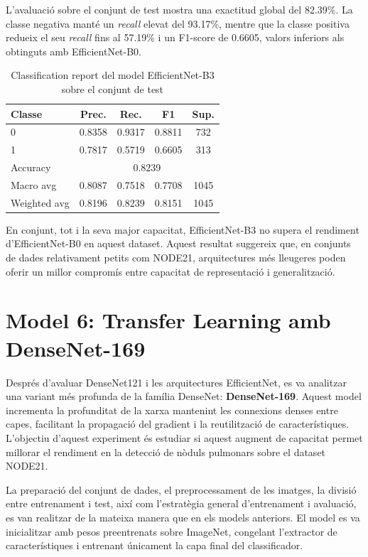 \documentclass[conference]{IEEEtran}
\begin{document}
L’avaluació sobre el conjunt de test mostra una exactitud global del 82.39\%. La classe
negativa manté un \textit{recall} elevat del 93.17\%, mentre que la classe positiva redueix
el seu \textit{recall} fins al 57.19\% i un F1-score de 0.6605, valors inferiors als obtinguts
amb EfficientNet-B0.

\begin{table}[H]
\caption{Classification report del model EfficientNet-B3 sobre el conjunt de test}
\label{tab:classification_report_efficientnet_b3}
\centering
\footnotesize
\setlength{\tabcolsep}{3pt}
\begin{tabular}{lcccc}
\toprule
\textbf{Classe} & \textbf{Prec.} & \textbf{Rec.} & \textbf{F1} & \textbf{Sup.} \\
\midrule
0 & 0.8358 & 0.9317 & 0.8811 & 732 \\
1 & 0.7817 & 0.5719 & 0.6605 & 313 \\
\midrule
Accuracy     & \multicolumn{4}{c}{0.8239} \\
Macro avg    & 0.8087 & 0.7518 & 0.7708 & 1045 \\
Weighted avg & 0.8196 & 0.8239 & 0.8151 & 1045 \\
\bottomrule
\end{tabular}
\end{table}

En conjunt, tot i la seva major capacitat, EfficientNet-B3 no supera el rendiment
d’EfficientNet-B0 en aquest dataset. Aquest resultat suggereix que, en conjunts de
dades relativament petits com NODE21, arquitectures més lleugeres poden oferir un
millor compromís entre capacitat de representació i generalització.

\section{Model 6: Transfer Learning amb DenseNet-169}

Després d’avaluar DenseNet121 i les arquitectures EfficientNet, es va analitzar una
variant més profunda de la família DenseNet: \textbf{DenseNet-169}. Aquest model
incrementa la profunditat de la xarxa mantenint les connexions denses entre capes,
facilitant la propagació del gradient i la reutilització de característiques. L’objectiu
d’aquest experiment és estudiar si aquest augment de capacitat permet millorar el
rendiment en la detecció de nòduls pulmonars sobre el dataset NODE21.

La preparació del conjunt de dades, el preprocessament de les imatges, la divisió
entre entrenament i test, així com l’estratègia general d’entrenament i avaluació, es
van realitzar de la mateixa manera que en els models anteriors. El model es va
inicialitzar amb pesos preentrenats sobre ImageNet, congelant l’extractor de
característiques i entrenant únicament la capa final del classificador.
\end{document}

